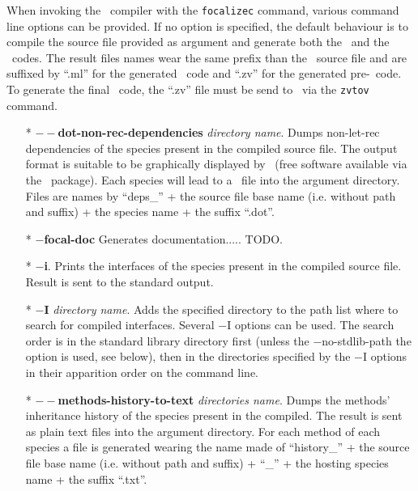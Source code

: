 \label{compiler-options}
When invoking the \focal\ compiler with the {\tt focalizec} command,
various command line options can be provided. If no option is
specified, the default behaviour is to compile the source file
provided as argument and generate both the \ocaml\ and the
\coq\ codes. The result files names wear the same prefix than the
\focal\ source file and are suffixed by ``.ml'' for the generated
\ocaml\ code and ``.zv'' for the generated pre-\coq\ code.
To generate the final \coq\ code, the ``.zv'' file must be send to
\zenon\ via the {\tt zvtov} command.

\begin{itemize}
  \item[*] {\bf $--$dot-non-rec-dependencies} {\em directory name}.
    Dumps non-let-rec dependencies of the species present in the
    compiled source file. The output format is suitable to be
    graphically displayed by \dotty\ (free software available via the
    \graphviz\ package). Each species will lead to a \dotty\ file into
    the argument directory. Files are names by ``deps\_'' + the source
    file base name (i.e. without path and suffix) + the species name +
    the suffix ``.dot''.

  \item[*] {\bf $-$focal-doc} Generates documentation..... TODO.

  \item[*] {\bf $-$i}. Prints the interfaces of the species present in
    the compiled source file. Result is sent to the standard output.

  \item[*] {\bf $-$I} {\em directory name}. Adds the specified
    directory to the path list where to search for compiled
    interfaces. Several $-$I options can be used. The search order is
    in the standard library directory first (unless the
    $-$no-stdlib-path the option is used, see below), then in the
    directories specified by the $-$I options in their apparition
    order on the command line.

 \item[*] {\bf $--$methods-history-to-text} {\em directories
   name}. Dumps the methods' inheritance history of the species
   present in the compiled. The result is sent as plain text files
   into the argument directory. For each method of each species a file
   is generated wearing the name made of ``history\_'' + the source
   file base name (i.e. without path and suffix) + ``\_'' + the
   hosting species name + the suffix ``.txt''.


\end{itemize}
